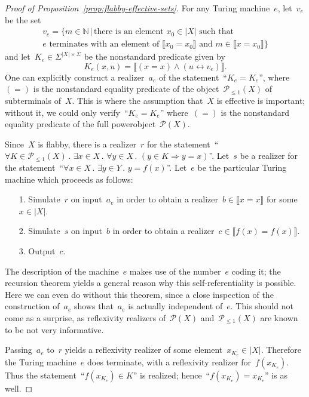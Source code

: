 \documentclass[oneside]{amsart}
\theoremstyle{definition}
\theoremstyle{plain}
\theoremstyle{remark}
\newcommand{\NN}{\mathbb{N}}
\renewcommand{\P}{\mathcal{P}}
\renewcommand{\_}{\mathpunct{.}\,}
\begin{document}
\begin{proof}[Proof of Proposition~\ref{prop:flabby-effective-sets}]
For any Turing machine~$e$, let~$v_e$ be the set
\begin{multline*}
  v_e = \{ m \in \NN \,|\,
  \text{there is an element~$x_0 \in |X|$ such that} \\
  \text{$e$ terminates with an element of~$\llbracket x_0 = x_0 \rrbracket$ and
  $m \in \llbracket x = x_0 \rrbracket$} \}
\end{multline*}
and let~$K_e \in \Sigma^{|X| \times \Sigma}$ be the nonstandard predicate given by
\[ K_e(x,u) = \llbracket (x = x) \wedge (u \leftrightarrow v_e) \rrbracket. \]
One can explicitly construct a realizer~$a_e$ of the statement~``$K_e = K_e$'',
where~$({=})$ is the nonstandard equality predicate of the object~$\P_{\leq1}(X)$
of subterminals of~$X$. This is where the assumption that~$X$ is effective is
important; without it, we could only verify~``$K_e = K_e$'' where~$({=})$ is
the nonstandard equality predicate of the full powerobject~$\P(X)$.

Since~$X$ is flabby, there is a realizer~$r$ for the statement~``$\forall K \in
\P_{\leq1}(X)\_ \exists x \in X\_ \forall y \in X\_ (y \in K \Rightarrow y =
x)$''. Let~$s$ be a realizer for the statement~``$\forall x \in X\_ \exists y
\in Y\_ y = f(x)$''. Let~$e$ be the particular Turing machine which proceeds as
follows:
\begin{enumerate}
\item[1.] Simulate~$r$ on input~$a_e$ in order to obtain a realizer~$b \in
\llbracket x = x \rrbracket$ for some~$x \in |X|$.
\item[2.] Simulate~$s$ on input~$b$ in order to obtain a realizer~$c \in \llbracket
f(x) = f(x) \rrbracket$.
\item[3.] Output~$c$.
\end{enumerate}
The description of the machine~$e$ makes use of the number~$e$ coding it;
the recursion theorem yields a general reason why this self-referentiality is
possible. Here we can even do without this theorem, since a close inspection of
the construction of~$a_e$ shows that~$a_e$ is actually independent of~$e$. This
should not come as a surprise, as reflexivity realizers of~$\P(X)$
and~$\P_{\leq1}(X)$ are known to be not very informative.

Passing~$a_e$ to~$r$ yields a reflexivity realizer of some element~$x_{K_e} \in
|X|$. Therefore the Turing machine~$e$ does terminate, with a reflexivity
realizer for~$f(x_{K_e})$. Thus the statement~``$f(x_{K_e}) \in K$'' is
realized; hence~``$f(x_{K_e}) = x_{K_e}$'' is as well.
\end{proof}
\end{document}
